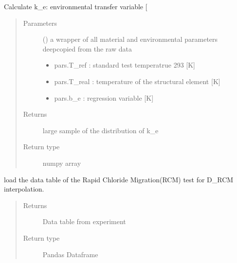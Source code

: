 \documentclass[letterpaper,10pt,english]{sphinxmanual}
\begin{document}
\begin{fulllineitems}
\label{\detokenize{chloride:chloride.k_e}}
\sphinxAtStartPar
Calculate k\_e: environmental transfer variable {[}\sphinxhyphen{}{]}
\begin{quote}\begin{description}
\item[{Parameters}] \leavevmode
\sphinxAtStartPar
{} () \textendash{} 
\sphinxAtStartPar
a wrapper of all material and environmental parameters deep\sphinxhyphen{}copied from the raw data
\begin{itemize}
\item {} 
\sphinxAtStartPar
pars.T\_ref  : standard test temperatrue 293 {[}K{]}

\item {} 
\sphinxAtStartPar
pars.T\_real : temperature of the structural element {[}K{]}

\item {} 
\sphinxAtStartPar
pars.b\_e    : regression variable {[}K{]}

\end{itemize}


\item[{Returns}] \leavevmode
\sphinxAtStartPar
large sample of the distribution of k\_e

\item[{Return type}] \leavevmode
\sphinxAtStartPar
numpy array

\end{description}\end{quote}

\end{fulllineitems}


\begin{fulllineitems}
\label{\detokenize{chloride:chloride.load_df_D_RCM}}
\sphinxAtStartPar
load the data table of the Rapid Chloride Migration(RCM) test
for D\_RCM interpolation.
\begin{quote}\begin{description}
\item[{Returns}] \leavevmode
\sphinxAtStartPar
Data table from experiment

\item[{Return type}] \leavevmode
\sphinxAtStartPar
Pandas Dataframe

\end{description}\end{quote}

\end{fulllineitems}
\end{document}
